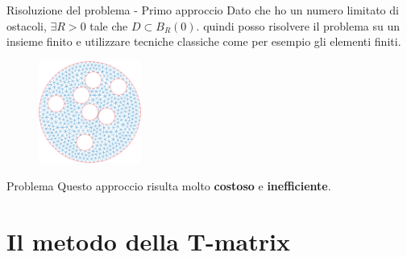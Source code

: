 \documentclass{beamer}
\begin{document}
	\begin{frame}{Risoluzione del problema - Primo approccio}
		Dato che ho un numero limitato di ostacoli, $\exists R>0$ tale che $D \subset B_R(0)$. quindi posso risolvere il problema su un insieme finito e utilizzare tecniche classiche come per esempio gli elementi finiti.
		\begin{figure}
			\includegraphics[width=0.3\textwidth]{figs/mesh.png}
		\end{figure}
		\begin{block}{Problema}
			Questo approccio risulta molto \textbf{costoso} e \textbf{inefficiente}.
		\end{block}
	\end{frame}
	
	\section{Il metodo della T-matrix}
	\sectionpage
	
\end{document}
